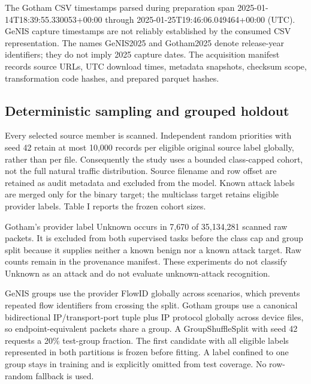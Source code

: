 \documentclass[conference,letterpaper]{IEEEtran}
\begin{document}
The Gotham CSV timestamps parsed during preparation span 2025-01-14T18:39:55.330053+00:00 through 2025-01-25T19:46:06.049464+00:00 (UTC). GeNIS capture timestamps are not reliably established by the consumed CSV representation. The names GeNIS2025 and Gotham2025 denote release-year identifiers; they do not imply 2025 capture dates. The acquisition manifest records source URLs, UTC download times, metadata snapshots, checksum scope, transformation code hashes, and prepared parquet hashes.

\subsection{Deterministic sampling and grouped holdout}
Every selected source member is scanned. Independent random priorities with seed 42 retain at most 10,000 records per eligible original source label globally, rather than per file. Consequently the study uses a bounded class-capped cohort, not the full natural traffic distribution. Source filename and row offset are retained as audit metadata and excluded from the model. Known attack labels are merged only for the binary target; the multiclass target retains eligible provider labels. Table I reports the frozen cohort sizes.

Gotham's provider label Unknown occurs in 7,670 of 35,134,281 scanned raw packets. It is excluded from both supervised tasks before the class cap and group split because it supplies neither a known benign nor a known attack target. Raw counts remain in the provenance manifest. These experiments do not classify Unknown as an attack and do not evaluate unknown-attack recognition.

GeNIS groups use the provider FlowID globally across scenarios, which prevents repeated flow identifiers from crossing the split. Gotham groups use a canonical bidirectional IP/transport-port tuple plus IP protocol globally across device files, so endpoint-equivalent packets share a group. A GroupShuffleSplit with seed 42 requests a 20\% test-group fraction. The first candidate with all eligible labels represented in both partitions is frozen before fitting. A label confined to one group stays in training and is explicitly omitted from test coverage. No row-random fallback is used.
\end{document}
